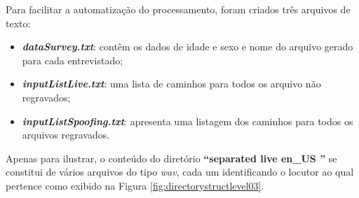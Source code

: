 		\par Para facilitar a automatização do processamento, foram criados três arquivos de texto:
		\begin{itemize}
			\item \textit{\textbf{dataSurvey.txt}}: contêm os dados de idade e sexo e nome do arquivo gerado para cada entrevistado;
			\item \textit{\textbf{inputListLive.txt}}: uma lista de caminhos para todos os arquivo não regravados;
			\item \textit{\textbf{inputListSpoofing.txt}}: apresenta uma listagem dos caminhos para todos os arquivos regravados.
		\end{itemize}
	
		\par Apenas para ilustrar, o conteúdo do diretório \textbf{``separated \textfractionsolidus live \textfractionsolidus en\_US ''} se constitui de vários arquivos do tipo \textit{wav}, cada um identificando o locutor ao qual pertence como exibido na Figura \ref{fig:directorystructlevel03}.
			
